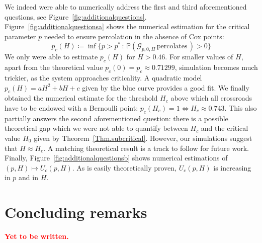\documentclass[10pt,a4paper]{amsart}
\theoremstyle{exampstyle}
\theoremstyle{exampnotations}
\begin{document}
We indeed were able to numerically address the first and third aforementioned questions, see Figure~\ref{fig:additionalquestions}. \\
Figure~\ref{fig:additionalquestionsa} shows the numerical estimation for the critical parameter $p$ needed to ensure percolation in the absence of Cox points:
\begin{equation*}
    p_c(H) \coloneqq \inf \lbrace p > p^* \, : \, \mathbb{P}(\mathcal{G}_{p,0,H} \, \text{percolates} \, ) > 0 \rbrace
\end{equation*}
We only were able to estimate $p_c(H)$ for $H>0.46$. For smaller values of $H$, apart from the theoretical value $p_c(0)=p_c \approx 0.71299$, simulation becomes much trickier, as the system approaches criticality. A quadratic model $p_c(H) = aH^2+bH+c$ given by the blue curve provides a good fit. We finally obtained the numerical estimate for the threshold $H_c$ above which all crossroads have to be endowed with a Bernoulli point: $p_c(H_c) = 1 \Leftrightarrow H_c \approx 0.743$. This also partially answers the second aforementioned question: there is a possible theoretical gap which we were not able to quantify between $H_c$ and the critical value $H_0$ given by Theorem~\ref{Thm.subcritical}. However, our simulations suggest that $H \approx H_c$. A matching theoretical result is a track to follow for future work. \\ Finally, Figure~\ref{fig:additionalquestionsb} shows numerical estimations of $(p,H) \mapsto U_c(p,H)$. As is easily theoretically proven, $U_c(p,H)$ is increasing in $p$ and in $H$. 

\section{Concluding remarks}
\label{S.Conclusion}
\textbf{\textcolor{red}{Yet to be written.}}


\end{document}
